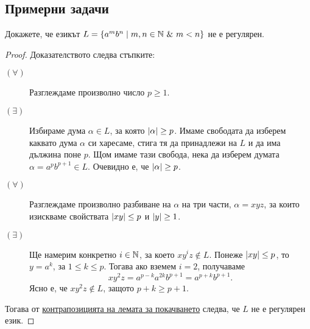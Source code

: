 \subsection{Примерни задачи}

\begin{extra}
\begin{problem}
  Докажете, че езикът $L = \{a^mb^n \mid m,n\in \mathbb{N}\ \&\ m < n\}$ не е регулярен.
\end{problem}
\begin{proof}
  Доказателството следва стъпките:
  \begin{description}
  \item[$(\forall)$]
    Разглеждаме произволно число $p \geq 1$.
  \item[$(\exists)$]
    Избираме дума $\alpha \in L$, за която $\vert{\alpha}\vert \geq p$. Имаме свободата да изберем каквато дума $\alpha$
    си харесаме, стига тя да принадлежи на $L$ и да има дължина поне $p$.
    Щом имаме тази свобода, нека да изберем думата $\alpha = a^{p}b^{p+1} \in L$. Очевидно е, че $\vert{\alpha}\vert \geq p$.
  \item[$(\forall)$]
    Разглеждаме произволно разбиване на $\alpha$ на три части, $\alpha = xyz$,
    за които изискваме свойствата $\vert{xy}\vert \leq p$ и $\vert{y}\vert \geq 1$.
  \item[$(\exists)$]
    Ще намерим конкретно $i\in\mathbb{N}$, за което $xy^iz \not\in L$.
    Понеже $\vert{xy}\vert \leq p$, то $y = a^k$, за  $1\leq k \leq p$.
    Тогава ако вземем $i = 2$, получаваме 
    \[xy^2z = a^{p-k}a^{2k}b^{p+1} = a^{p+k}b^{p+1}.\]
    Ясно е, че $xy^2z \not\in L$, защото $p+k \geq p+1$.
  \end{description}
  Тогава от \hyperref[cor:pumping-reg]{контрапозицията на лемата за покачването} следва, че $L$ не е регулярен език.
\end{proof}


\end{extra}
